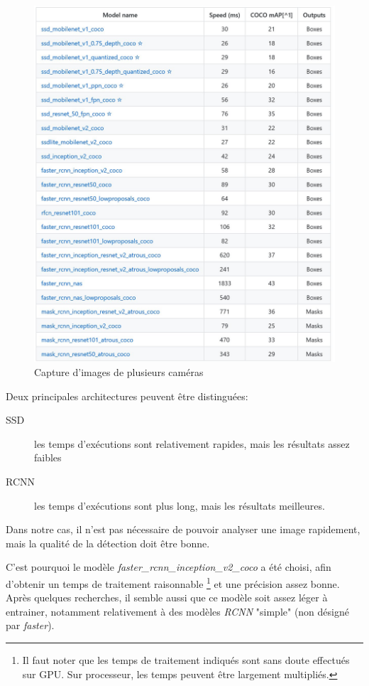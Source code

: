 \begin{figure}[!ht]
    \includegraphics[width=130mm]{img/conception/nn/tensorflow_models.png}
    \centering
    \caption{Capture d'images de plusieurs caméras}
    \label{fig:tensorflow_models}
\end{figure}


Deux principales architectures peuvent être distinguées:
\begin{description}
    \item[SSD] les temps d'exécutions sont relativement rapides, mais les résultats assez faibles
    \item[RCNN] les temps d'exécutions sont plus long, mais les résultats meilleures.
\end{description}

Dans notre cas, il n'est pas nécessaire de pouvoir analyser une image rapidement, mais la qualité de la détection doit être bonne. 

C'est pourquoi le modèle \textit{faster\_rcnn\_inception\_v2\_coco} a été choisi, afin d'obtenir un temps de traitement raisonnable \footnote{Il faut noter que les temps de traitement indiqués sont sans doute effectués sur GPU. Sur processeur, les temps peuvent être largement multipliés.} et une précision assez bonne. Après quelques recherches, il semble aussi que ce modèle soit assez léger à entrainer, notamment relativement à des modèles \textit{RCNN} "simple" (non désigné par \textit{faster}).

